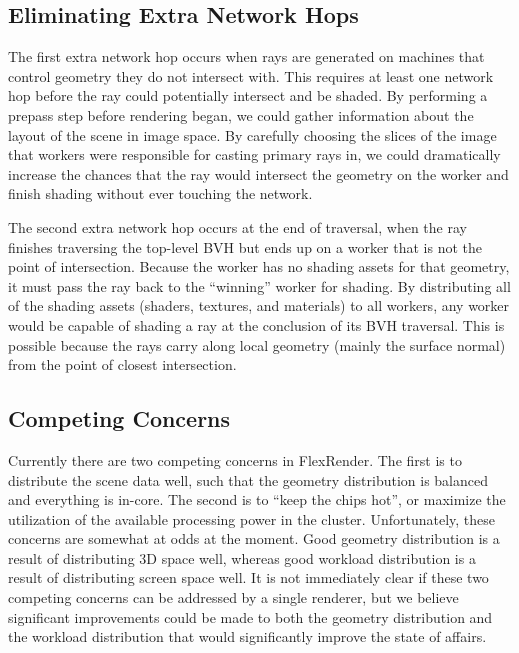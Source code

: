 \documentclass[12pt]{ucthesis}
\begin{document}
\subsection{Eliminating Extra Network Hops}
\label{networkhop}

The first extra network hop occurs when rays are generated on machines that
control geometry they do not intersect with. This requires at least one
network hop before the ray could potentially intersect and be shaded. By performing
a prepass step before rendering began, we could gather information about the
layout of the scene in image space. By carefully choosing the slices of the
image that workers were responsible for casting primary rays in, we could
dramatically increase the chances that the ray would intersect the geometry
on the worker and finish shading without ever touching the network.

The second extra network hop occurs at the end of traversal, when the ray finishes
traversing the top-level BVH but ends up on a worker that is not the point of
intersection. Because the worker has no shading assets for that geometry, it
must pass the ray back to the ``winning'' worker for shading. By distributing
all of the shading assets (shaders, textures, and materials) to all workers,
any worker would be capable of shading a ray at the conclusion of its BVH traversal.
This is possible because the rays carry along local geometry (mainly the surface
normal) from the point of closest intersection.

\subsection{Competing Concerns}
\label{concerns}

Currently there are two competing concerns in FlexRender. The first is to
distribute the scene data well, such that the geometry distribution is balanced
and everything is in-core. The second is to ``keep the chips hot'', or maximize
the utilization of the available processing power in the cluster. Unfortunately,
these concerns are somewhat at odds at the moment. Good geometry distribution
is a result of distributing 3D space well, whereas good workload distribution
is a result of distributing screen space well. It is not immediately clear if
these two competing concerns can be addressed by a single renderer, but we
believe significant improvements could be made to both the geometry distribution
and the workload distribution that would significantly improve the state of affairs.
\end{document}
